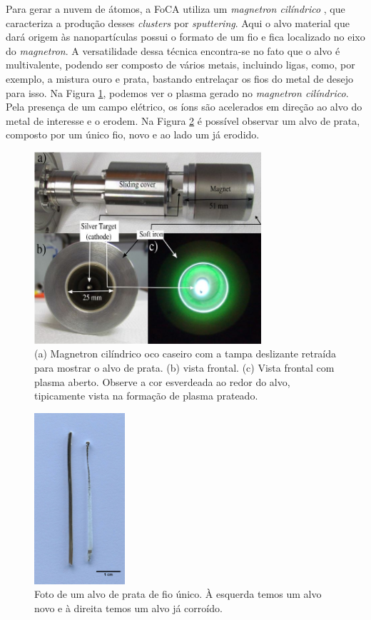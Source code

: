 Para gerar a nuvem de átomos, a FoCA utiliza um \textit{magnetron cilíndrico} \cite{ref_artigo_foca}, que caracteriza a produção desses \textit{clusters} por \textit{sputtering}. Aqui o alvo material que dará origem às nanopartículas possui o formato de um fio e fica localizado no eixo do \textit{magnetron}. A versatilidade dessa técnica encontra-se no fato que o alvo é multivalente, podendo ser composto de vários metais, incluindo ligas, como, por exemplo, a mistura ouro e prata, bastando entrelaçar os fios do metal de desejo para isso. Na Figura \ref{fig:magnetron}, podemos ver o plasma gerado no \textit{magnetron cilíndrico}. Pela presença de um campo elétrico, os íons são acelerados em direção ao alvo do metal de interesse e o erodem. Na Figura \ref{fig:alvo} é possível observar um alvo de prata, composto por um único fio, novo e ao lado um já erodido.

\begin{figure}
  \centering
  \includegraphics[width=0.75\textwidth]{images/foca/magnetron_cil}
  \caption{ (a) Magnetron cilíndrico oco caseiro com a tampa deslizante retraída para mostrar o alvo de prata. (b) vista frontal. (c) Vista frontal com plasma aberto. Observe a cor esverdeada ao redor do alvo, tipicamente vista na formação de plasma prateado.\cite{livro_vitor} }
  \label{fig:magnetron}  
\end{figure}



\begin{figure}
  \centering
  \includegraphics[width=0.3\textwidth]{images/foca/alvo}
  \caption{ Foto de um alvo de prata de fio único. À esquerda temos um alvo novo e à direita temos um alvo já corroído.  }
  \label{fig:alvo}
\end{figure}
